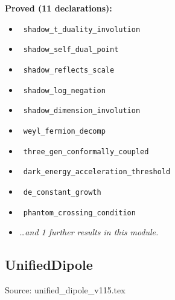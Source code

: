 \documentclass{report}
\theoremstyle{definition}
\begin{document}
\begin{itemize}
\begin{itemize}
\noindent\textbf{Proved (11 declarations):}
\begin{itemize}
  \item {}\leanok\ \texttt{shadow\_t\_duality\_involution}
  \item {}\leanok\ \texttt{shadow\_self\_dual\_point}
  \item {}\leanok\ \texttt{shadow\_reflects\_scale}
  \item {}\leanok\ \texttt{shadow\_log\_negation}
  \item {}\leanok\ \texttt{shadow\_dimension\_involution}
  \item {}\leanok\ \texttt{weyl\_fermion\_decomp}
  \item {}\leanok\ \texttt{three\_gen\_conformally\_coupled}
  \item {}\leanok\ \texttt{dark\_energy\_acceleration\_threshold}
  \item {}\leanok\ \texttt{de\_constant\_growth}
  \item {}\leanok\ \texttt{phantom\_crossing\_condition}
  \item \emph{\ldots and 1 further results in this module.}
\end{itemize}

\subsection{UnifiedDipole}
Source: unified\_dipole\_v115.tex


\end{itemize}
\end{itemize}
\end{document}
